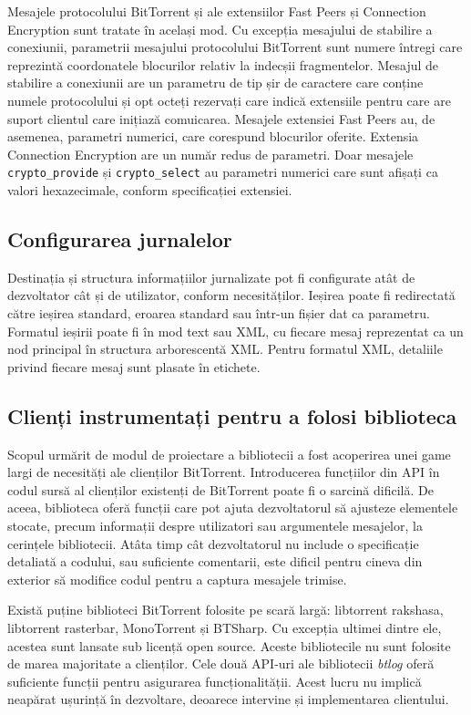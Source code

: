 Mesajele protocolului BitTorrent și ale extensiilor Fast Peers și Connection
Encryption sunt tratate în același mod. Cu excepția mesajului de stabilire
a conexiunii, parametrii mesajului protocolului BitTorrent sunt numere întregi
care reprezintă coordonatele blocurilor relativ la indecșii fragmentelor.
Mesajul de stabilire a conexiunii are un parametru de tip șir de caractere
care conține numele protocolului și opt octeți rezervați care indică
extensiile pentru care are suport clientul care inițiază comuicarea. Mesajele
extensiei Fast Peers au, de asemenea, parametri numerici, care corespund
blocurilor oferite. Extensia Connection Encryption are un număr redus de
parametri. Doar mesajele \texttt{crypto\_provide} și \texttt{crypto\_select}
au parametri numerici care sunt afișați ca valori hexazecimale, conform
specificației extensiei.

\subsection{Configurarea jurnalelor}

Destinația și structura informațiilor jurnalizate pot fi configurate
atât de dezvoltator cât și de utilizator, conform necesităților. Ieșirea poate
fi redirectată către ieșirea standard, eroarea standard sau într-un fișier
dat ca parametru. Formatul ieșirii poate fi în mod text sau XML, cu fiecare
mesaj reprezentat ca un nod principal în structura arborescentă XML. Pentru
formatul XML, detaliile privind fiecare mesaj sunt plasate în etichete.

\subsection{Clienți instrumentați pentru a folosi biblioteca}

Scopul urmărit de modul de proiectare a bibliotecii a fost acoperirea unei
game largi de necesități ale clienților BitTorrent. Introducerea funcțiilor
din API în codul sursă al clienților existenți de BitTorrent poate fi o
sarcină dificilă. De aceea, biblioteca oferă funcții care pot ajuta
dezvoltatorul să ajusteze elementele stocate, precum informații despre
utilizatori sau argumentele mesajelor, la cerințele bibliotecii. Atâta timp cât
dezvoltatorul nu include o specificație detaliată a codului, sau suficiente
comentarii, este dificil pentru cineva din exterior să modifice codul pentru
a captura mesajele trimise.

Există puține biblioteci BitTorrent folosite pe scară largă:
libtorrent rakshasa, libtorrent rasterbar, MonoTorrent și BTSharp.
Cu excepția ultimei dintre ele, acestea sunt lansate sub licență open source.
Aceste bibliotecile nu sunt folosite de marea majoritate a clienților. Cele două
API-uri ale bibliotecii \textit{btlog} oferă suficiente funcții pentru
asigurarea funcționalității. Acest lucru nu implică neapărat ușurință în
dezvoltare, deoarece intervine și implementarea clientului.

